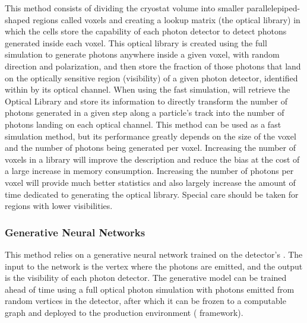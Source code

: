 \documentclass[../main-v1.tex]{subfiles}
\begin{document}
This method consists of dividing the cryostat volume into smaller parallelepiped-shaped regions called voxels and creating a lookup matrix %
(the optical library) %
in which the cells store the capability of each photon detector to detect photons generated inside each voxel.
This optical library is created using the full  simulation to generate photons anywhere inside a given voxel, with random direction and polarization, and then store the fraction of those photons that land on the optically sensitive region (visibility) of a given photon detector, identified within   by its optical channel. When using the fast simulation,   will retrieve the Optical Library and store its information to directly transform the number %
of photons generated in a given step along a particle's track into the number of photons landing on each optical channel.
This method can %
be used as a fast simulation method, but %
its performance greatly depends on the size of the voxel and the number of photons being generated per voxel. Increasing the number of voxels in a library will improve the description and reduce the bias at the cost of a large increase in memory consumption. Increasing the number of photons per voxel will provide much better statistics and also largely increase the amount of time dedicated to generating the optical library. Special care should be taken for regions with %
lower visibilities.

\subsubsection{Generative Neural Networks}

This method relies on a generative neural network  trained on the detector's . %
The input to the network is the vertex where the photons are emitted, and the output is the visibility of each photon detector. 
The generative model can be trained ahead of time using a full   optical photon simulation with photons emitted from random vertices in the detector, after which it can be frozen to a computable graph and deployed to the production environment (  framework).
\end{document}
